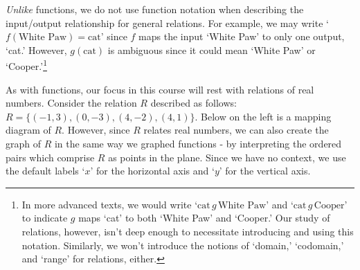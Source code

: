 \smallskip

\textit{Unlike} functions, we do not use function notation when describing the input/output relationship for general relations.  For example, we may write `$f(\text{White Paw}) = \text{cat}$'  since $f$ maps the input `White Paw' to only one output, `cat.'  However, $g(\text{cat})$ is ambiguous since it could mean `White Paw' or `Cooper.'\footnote{In more advanced texts, we would write `$\text{cat} \, g \, \text{White Paw}$' and `$\text{cat} \,  g \, \text{Cooper}$' to indicate $g$ maps `cat' to both `White Paw' and `Cooper.'  Our study of relations, however, isn't deep enough to necessitate introducing and using this notation.  Similarly, we won't introduce the notions of `domain,' `codomain,' and `range' for relations, either.}

\smallskip

As with functions, our focus in this course will rest with relations of real numbers.  Consider the relation $R$ described as follows:  $R = \{ (-1,3), (0,-3), (4,-2), (4,1) \}$.  Below on the left is a mapping diagram of $R$.  However, since $R$ relates real numbers, we can also create the graph of $R$ in the same way we graphed functions - by interpreting the ordered pairs which comprise $R$ as points in the plane.  Since we have no context, we use the default labels `$x$' for the horizontal axis and `$y$' for the vertical axis.

